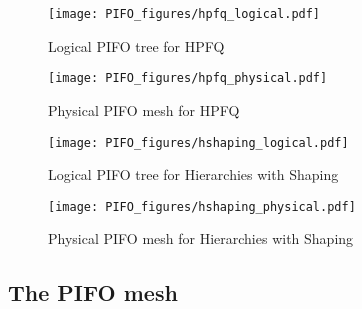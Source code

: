 \begin{figure*}[!t]
  \begin{subfigure}[b]{0.5\textwidth}
  \begin{center}
  \texttt{[image: PIFO\_figures/hpfq\_logical.pdf]}
  \caption{Logical PIFO tree for HPFQ}
  \label{fig:hpfq_path}
  \end{center}
  \end{subfigure}
  \begin{subfigure}[b]{0.5\textwidth}
  \begin{center}
  \texttt{[image: PIFO\_figures/hpfq\_physical.pdf]}
  \caption{Physical PIFO mesh for HPFQ}
  \label{fig:hpfq_mesh}
  \end{center}
  \end{subfigure}
  \caption{Compiling HPFQ (Figure~\ref{fig:hpfq}) to a PIFO mesh. On the left,
  the logical PIFO tree captures relationships between PIFOs: which PIFOs dequeue
  or enqueue into which PIFOs. Red arrows indicate dequeues, blue indicates
  enqueues.  On the right, we show the physical PIFO mesh for the logical PIFO
  tree on the left, following the same notation.}
  \label{fig:hpfq_compiling}
\end{figure*}


\begin{figure*}[!t]
  \begin{subfigure}[b]{0.5\textwidth}
  \texttt{[image: PIFO\_figures/hshaping\_logical.pdf]}
  \caption{Logical PIFO tree for Hierarchies with Shaping}
  \label{fig:hshaping_path}
  \end{subfigure}
  \begin{subfigure}[b]{0.5\textwidth}
  \texttt{[image: PIFO\_figures/hshaping\_physical.pdf]}
  \caption{Physical PIFO mesh for Hierarchies with Shaping}
  \label{fig:hshaping_mesh}
  \end{subfigure}
  \caption{Compiling Hierarchies with Shaping (Figure~\ref{fig:hpfq}) to a PIFO mesh. Same comments as Figure~\ref{fig:hpfq_compiling} apply.}
\end{figure*}


\subsection{The PIFO mesh}
\label{ss:mesh}

